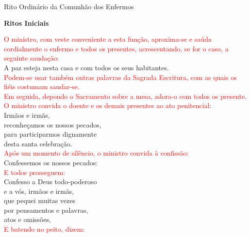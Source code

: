 \documentclass{book}
\begin{document}
\pagestyle{empty}
\begin{center}
    \large Rito Ordinário da Comunhão dos Enfermos
\end{center}
\begin{center}
    \textbf{Ritos Iniciais}
\end{center}
\begin{flushleft}
    \textcolor{red}{O ministro, com veste conveniente a esta função, aproxima-se e saúda cordialmente o enfermo e todos os presentes, acrescentando, se for o caso, a seguinte saudação:}
    \vspace{.1cm} \\
    A paz esteja nesta casa e com todos os seus habitantes.
    \vspace{.1cm} \\
    \textcolor{red}{Podem-se usar também outras palavras da Sagrada Escritura, com as quais os fiéis costumam saudar-se. \\ Em seguida, depondo o Sacramento sobre a mesa, adora-o com todos os presente. \\ O ministro convida o doente e os demais presentes ao ato penitencial:}
    \vspace{.1cm} \\
    Irmãos e irmãs, \\
    reconheçamos os nossos pecados, \\
    para participarmos dignamente \\
    desta santa celebração.
    \vspace{.1cm} \\
    \textcolor{red}{Após um momento de silêncio, o ministro convida à confissão:}
    \vspace{.1cm} \\
    Confessemos os nossos pecados:
    \vspace{.1cm} \\
    \textcolor{red}{E todos prosseguem:}
    \vspace{.1cm} \\
    Confesso a Deus todo-poderoso \\
    e a vós, irmãos e irmãs, \\
    que pequei muitas vezes \\
    por pensamentos e palavras, \\
    atos e omissões,
    \vspace{.1cm} \\
    \textcolor{red}{E batendo no peito, dizem:}
    \vspace{.1cm} \\

\end{flushleft}
\end{document}
